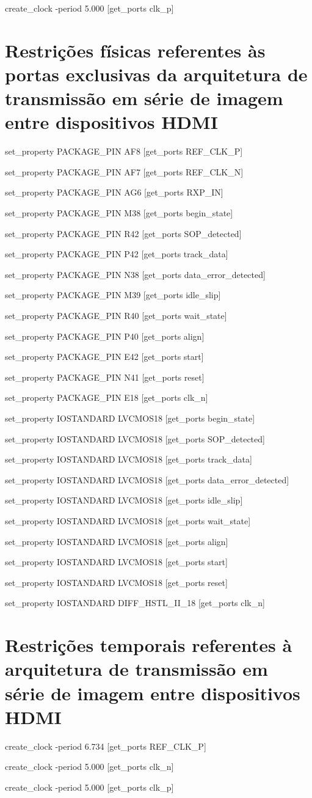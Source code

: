 create\_clock -period 5.000 [get\_ports clk\_p]


\section{Restrições físicas referentes às portas exclusivas da arquitetura de transmissão em série de imagem entre dispositivos HDMI} \label{ap:fisicas_planE}

set\_property PACKAGE\_PIN AF8 [get\_ports REF\_CLK\_P]

set\_property PACKAGE\_PIN AF7 [get\_ports REF\_CLK\_N]

set\_property PACKAGE\_PIN AG6 [get\_ports RXP\_IN]

set\_property PACKAGE\_PIN M38 [get\_ports begin\_state]

set\_property PACKAGE\_PIN R42 [get\_ports SOP\_detected]

set\_property PACKAGE\_PIN P42 [get\_ports track\_data]

set\_property PACKAGE\_PIN N38 [get\_ports data\_error\_detected]

set\_property PACKAGE\_PIN M39 [get\_ports idle\_slip]

set\_property PACKAGE\_PIN R40 [get\_ports wait\_state]

set\_property PACKAGE\_PIN P40 [get\_ports align]

set\_property PACKAGE\_PIN E42 [get\_ports start]

set\_property PACKAGE\_PIN N41 [get\_ports reset]

set\_property PACKAGE\_PIN E18 [get\_ports clk\_n]

set\_property IOSTANDARD LVCMOS18 [get\_ports begin\_state]

set\_property IOSTANDARD LVCMOS18 [get\_ports SOP\_detected]

set\_property IOSTANDARD LVCMOS18 [get\_ports track\_data]

set\_property IOSTANDARD LVCMOS18 [get\_ports data\_error\_detected]

set\_property IOSTANDARD LVCMOS18 [get\_ports idle\_slip]

set\_property IOSTANDARD LVCMOS18 [get\_ports wait\_state]

set\_property IOSTANDARD LVCMOS18 [get\_ports align]

set\_property IOSTANDARD LVCMOS18 [get\_ports start]

set\_property IOSTANDARD LVCMOS18 [get\_ports reset]

set\_property IOSTANDARD DIFF\_HSTL\_II\_18 [get\_ports clk\_n]

\section{Restrições temporais referentes à arquitetura de transmissão em série de imagem entre dispositivos HDMI} \label{ap:temporais_planE}

create\_clock -period 6.734 [get\_ports REF\_CLK\_P]

create\_clock -period 5.000 [get\_ports clk\_n]

create\_clock -period 5.000 [get\_ports clk\_p]
